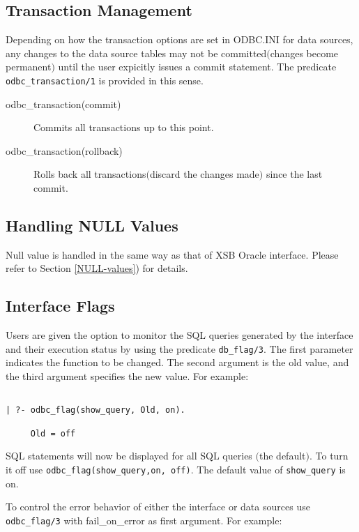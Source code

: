 \subsection{Transaction Management}\label{TransactionManagement}
Depending on how the transaction options are set in ODBC.INI for data sources, 
any changes to the data source tables may not be committed$($changes become 
permanent$)$  until the user expicitly issues a commit statement. 
The predicate {\tt odbc\_transaction/1} is provided in this sense. 
\begin{description}
\item[odbc\_transaction(commit)]
        Commits all transactions up to this point.
\item[odbc\_transaction(rollback)]
        Rolls back all transactions$($discard the changes made$)$  since 
the last commit.
\end{description}

\subsection{Handling NULL Values}
Null value is handled in the same way as that of XSB Oracle interface.
Please refer to Section \ref{NULL-values}) for details.

\subsection{Interface Flags}

Users are given the option to monitor the SQL queries generated 
by the interface and their execution status by using the 
predicate {\tt db\_flag/3}.  The first parameter indicates the function  to be
changed.  The second argument is the old value, and the third argument specifies
the new value.  For example:
\begin{verbatim}

| ?- odbc_flag(show_query, Old, on).

     Old = off
\end{verbatim}

SQL statements will now be displayed for all SQL queries $($the default$)$.
To turn it off use {\tt odbc\_flag(show\_query,on, off)}.  The default value 
of {\tt show\_query} is on.

To control the error behavior of either the interface or
data sources use {\tt odbc\_flag/3} with fail\_on\_error as first argument.
For example:

